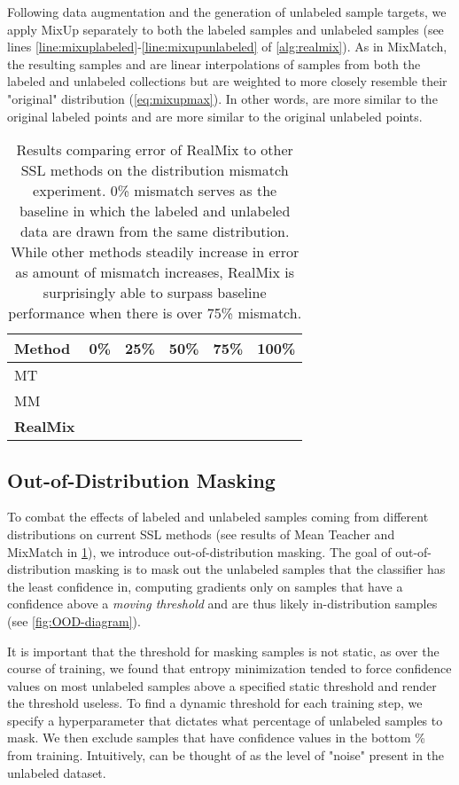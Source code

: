 \documentclass[10pt,twocolumn,letterpaper]{article}
\begin{document}
Following data augmentation and the generation of unlabeled sample targets, we apply MixUp separately to both the labeled samples  and unlabeled samples  (see lines \ref{line:mixuplabeled}-\ref{line:mixupunlabeled} of \cref{alg:realmix}). As in MixMatch, the resulting samples  and  are linear interpolations of samples from both the labeled and unlabeled collections but are weighted to more closely resemble their "original" distribution (\cref{eq:mixupmax}). In other words,  are more similar to the original labeled points and  are more similar to the original unlabeled points. 

\begin{table}[h]
\centering
\begin{tabular}{|l|rrrrr|}
    \hline
    Method & 0\% & 25\% & 50\% & 75\% & 100\% \\ \hline
    MT \cite{meanteacherTarvainen} &  &  &  &  & \\
    MM \cite{mixmatchBerthelot} &  &  &  &  & \\\hline
    \textbf{RealMix} &  &  &  &  & \\ \hline
\end{tabular}
\caption{Results comparing error of RealMix to other SSL methods on the distribution mismatch experiment. 0\% mismatch serves as the baseline in which the labeled and unlabeled data are drawn from the same distribution. While other methods steadily increase in error as amount of mismatch increases, RealMix is surprisingly able to surpass baseline performance when there is over 75\% mismatch.}
\label{table:oodresults}
\end{table}

\subsection{Out-of-Distribution Masking}
\label{ofdmasking}
To combat the effects of labeled and unlabeled samples coming from different distributions on current SSL methods (see results of Mean Teacher and MixMatch in \cref{table:oodresults}), we introduce out-of-distribution masking. The goal of out-of-distribution masking is to mask out the unlabeled samples that the classifier has the least confidence in, computing gradients only on samples that have a confidence above a \textit{moving threshold} and are thus likely in-distribution samples (see \cref{fig:OOD-diagram}).

It is important that the threshold for masking samples is not static, as over the course of training, we found that entropy minimization tended to force confidence values on most unlabeled samples above a specified static threshold and render the threshold useless. To find a dynamic threshold for each training step, we specify a hyperparameter  that dictates what percentage of unlabeled samples to mask. We then exclude samples that have confidence values in the bottom \% from training. Intuitively,  can be thought of as the level of "noise" present in the unlabeled dataset.
\end{document}

